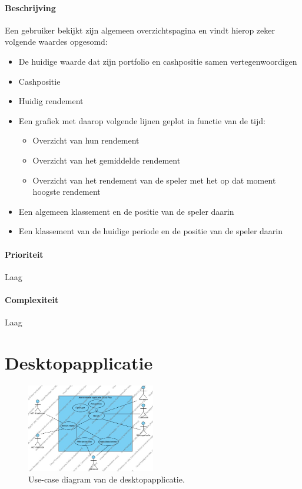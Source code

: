 \paragraph{Beschrijving} Een gebruiker bekijkt zijn algemeen overzichtspagina en vindt hierop zeker volgende waardes opgesomd:
\begin{itemize}
	\item De huidige waarde dat zijn portfolio en cashpositie samen vertegenwoordigen
	\item Cashpositie
	\item Huidig rendement
	\item Een grafiek met daarop volgende lijnen geplot in functie van de tijd:
  \begin{itemize}
  	\item  Overzicht van hun rendement
    \item Overzicht van het gemiddelde rendement
    \item Overzicht van het rendement van de speler met het op dat moment hoogste rendement
  \end{itemize}
  \item Een algemeen klassement en de positie van de speler daarin
  \item Een klassement van de huidige periode en de positie van de speler daarin
\end{itemize}
\paragraph{Prioriteit}Laag
\paragraph{Complexiteit}Laag

\section{Desktopapplicatie}


\begin{figure}[h!]
	\centering
		\includegraphics[width=0.5\textwidth]{images/analyse/ucd_desktop}
	\caption{Use-case diagram van de desktopapplicatie.}
\end{figure}

